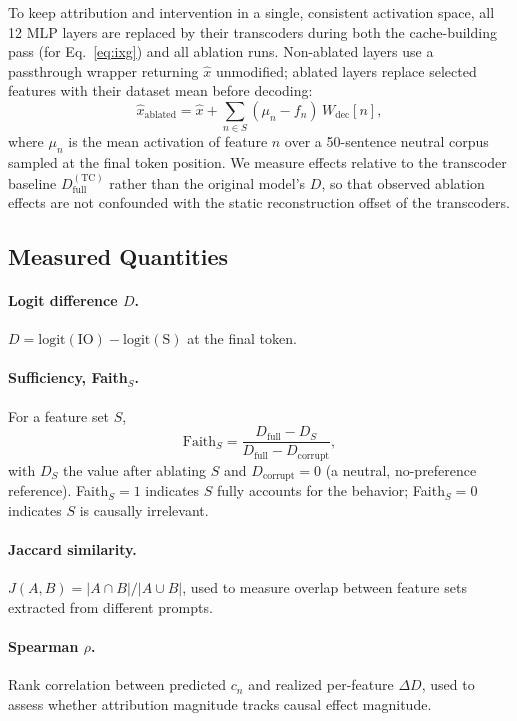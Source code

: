 \documentclass{article}
\begin{document}
To keep attribution and intervention in a single, consistent activation space,
all 12 MLP layers are replaced by their transcoders during both the
cache-building pass (for Eq.~\ref{eq:ixg}) and all ablation runs. Non-ablated
layers use a passthrough wrapper returning $\hat{x}$ unmodified; ablated layers
replace selected features with their dataset mean before decoding:
\begin{equation}
  \hat{x}_\text{ablated} = \hat{x} + \sum_{n \in S} (\mu_n - f_n)\, W_\text{dec}[n],
  \label{eq:ablation}
\end{equation}
where $\mu_n$ is the mean activation of feature $n$ over a 50-sentence neutral
corpus sampled at the final token position. We measure effects relative to the
transcoder baseline $D_\text{full}^{(\text{TC})}$ rather than the original
model's $D$, so that observed ablation effects are not confounded with the
static reconstruction offset of the transcoders.

\subsection{Measured Quantities}

\paragraph{Logit difference $D$.}
$D = \text{logit}(\text{IO}) - \text{logit}(\text{S})$ at the final token.

\paragraph{Sufficiency, Faith$_S$.}
For a feature set $S$,
\begin{equation}
  \text{Faith}_S = \frac{D_\text{full} - D_S}{D_\text{full} - D_\text{corrupt}},
  \label{eq:faith}
\end{equation}
with $D_S$ the value after ablating $S$ and $D_\text{corrupt} = 0$ (a neutral,
no-preference reference). Faith$_S = 1$ indicates $S$ fully accounts for the
behavior; Faith$_S = 0$ indicates $S$ is causally irrelevant.

\paragraph{Jaccard similarity.}
$J(A, B) = |A \cap B| / |A \cup B|$, used to measure overlap between feature
sets extracted from different prompts.

\paragraph{Spearman $\rho$.}
Rank correlation between predicted $c_n$ and realized per-feature $\Delta D$,
used to assess whether attribution magnitude tracks causal effect magnitude.
\end{document}
